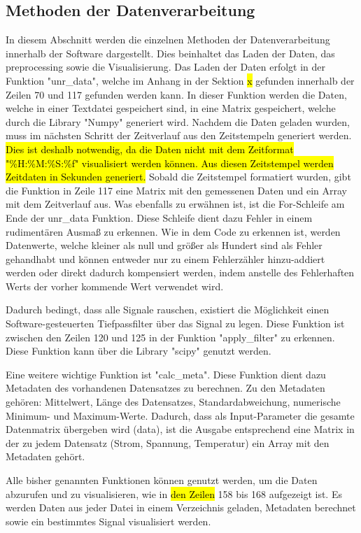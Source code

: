 \subsection{Methoden der Datenverarbeitung}
In diesem Abschnitt werden die einzelnen Methoden der Datenverarbeitung innerhalb der Software dargestellt. Dies beinhaltet das Laden der Daten, das preprocessing sowie die Visualisierung. Das Laden der Daten erfolgt in der Funktion "unr\_data", welche im Anhang in der Sektion \hl{x} gefunden innerhalb der Zeilen 70 und 117 gefunden werden kann. In dieser Funktion werden die Daten, welche in einer Textdatei gespeichert sind, in eine Matrix gespeichert, welche durch die Library "Numpy" generiert wird. Nachdem die Daten geladen wurden, muss im nächsten Schritt der Zeitverlauf aus den Zeitstempeln generiert werden. \hl{Dies ist deshalb notwendig, da die Daten nicht mit dem Zeitformat "\%H:\%M:\%S:\%f" visualisiert werden können. Aus diesen Zeitstempel werden Zeitdaten in Sekunden generiert.} Sobald die Zeitstempel formatiert wurden, gibt die Funktion in Zeile 117 eine Matrix mit den gemessenen Daten und ein Array mit dem Zeitverlauf aus. Was ebenfalls zu erwähnen ist, ist die For-Schleife am Ende der unr\_data Funktion. Diese Schleife dient dazu Fehler in einem rudimentären Ausmaß zu erkennen. Wie in dem Code zu erkennen ist, werden Datenwerte, welche kleiner als null und größer als Hundert sind als Fehler gehandhabt und können entweder nur zu einem Fehlerzähler hinzu-addiert werden oder direkt dadurch kompensiert werden, indem anstelle des Fehlerhaften Werts der vorher kommende Wert verwendet wird.

Dadurch bedingt, dass alle Signale rauschen, existiert die Möglichkeit einen Software-gesteuerten Tiefpassfilter über das Signal zu legen. Diese Funktion ist zwischen den Zeilen 120 und 125 in der Funktion "apply\_filter" zu erkennen. Diese Funktion kann über die Library "scipy" genutzt werden. 

Eine weitere wichtige Funktion ist "calc\_meta". Diese Funktion dient dazu Metadaten des vorhandenen Datensatzes zu berechnen. Zu den Metadaten gehören: Mittelwert, Länge des Datensatzes, Standardabweichung, numerische Minimum- und Maximum-Werte. Dadurch, dass als Input-Parameter die gesamte Datenmatrix übergeben wird (data), ist die Ausgabe entsprechend eine Matrix in der zu jedem Datensatz (Strom, Spannung, Temperatur) ein Array mit den Metadaten gehört.

Alle bisher genannten Funktionen können genutzt werden, um die Daten abzurufen und zu visualisieren, wie in \hl{den Zeilen} 158 bis 168 aufgezeigt ist. Es werden Daten aus jeder Datei in einem Verzeichnis geladen, Metadaten berechnet sowie ein bestimmtes Signal visualisiert werden.

